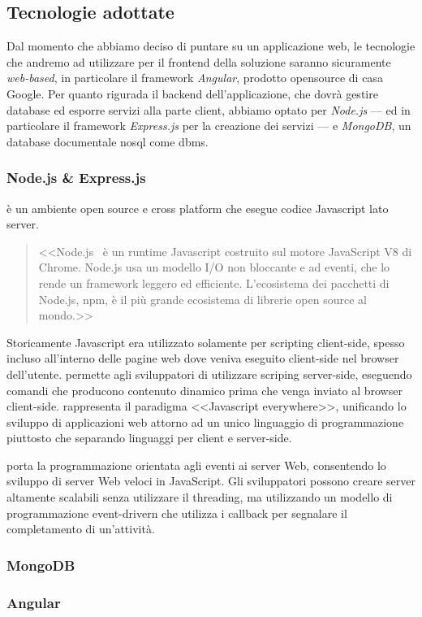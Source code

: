 \subsection{Tecnologie adottate}
Dal momento che abbiamo deciso di puntare su un applicazione web, le tecnologie che andremo ad utilizzare per il frontend della soluzione saranno sicuramente \textit{web-based}, in particolare il framework \textit{Angular}, prodotto opensource di casa Google. 
Per quanto rigurada il backend dell'applicazione, che dovrà gestire database ed esporre servizi alla parte client, abbiamo optato per \textit{Node.js} --- ed in particolare il framework \textit{Express.js} per la creazione dei servizi --- e \textit{MongoDB}, un database documentale \acrshort{nosql} come \acrshort{dbms}.

\subsubsection{Node.js \& Express.js}
\nodejs è un ambiente open source e cross platform che esegue codice Javascript lato server.
\begin{quote}
	<<Node.js\textregistered ~ è un runtime Javascript costruito sul motore JavaScript V8 di Chrome. Node.js usa un modello I/O non bloccante e ad eventi, che lo rende un framework leggero ed efficiente. L'ecosistema dei pacchetti di Node.js, npm, è il più grande ecosistema di librerie open source al mondo.>> \cite{nodejs}
\end{quote}

Storicamente Javascript era utilizzato solamente per scripting client-side, spesso incluso all'interno delle pagine web dove veniva eseguito client-side nel browser dell'utente. \nodejs permette agli sviluppatori di utilizzare scriping server-side, eseguendo comandi che producono contenuto dinamico prima che venga inviato al browser client-side. \nodejs rappresenta il paradigma <<Javascript everywhere>>\cite{jseverywhere}, unificando lo sviluppo di applicazioni web attorno ad un unico linguaggio di programmazione piuttosto che separando  linguaggi per client e server-side.

\nodejs porta la programmazione orientata agli eventi ai server Web, consentendo lo sviluppo di server Web veloci in JavaScript. Gli sviluppatori possono creare server altamente scalabili senza utilizzare il threading, ma utilizzando un modello di programmazione event-drivern che utilizza i callback per segnalare il completamento di un'attività.


\subsubsection{MongoDB}
\subsubsection{Angular}